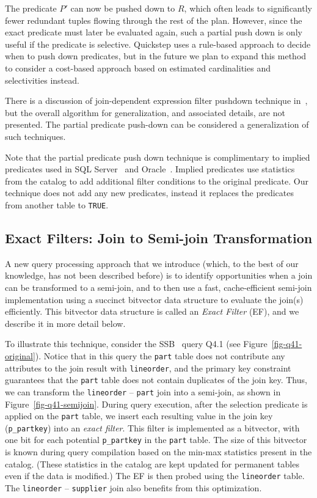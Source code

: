 The predicate $P'$ can now be pushed down to $R$, which often leads to significantly fewer redundant tuples flowing through the rest of the plan. However, since the exact predicate must later be evaluated again, such a partial push down is only useful if the predicate is selective. Quickstep uses a rule-based approach to decide when to push down predicates, but in the future we plan to expand this method to consider a cost-based approach based on estimated cardinalities and selectivities instead.

There is a discussion of join-dependent expression filter pushdown technique in~\cite{BonczNE13}, but the overall algorithm for generalization, and associated details, are not presented. 
The partial predicate push-down can be considered a generalization of such techniques.

Note that the partial predicate push down technique is complimentary to implied predicates used in SQL Server~\cite{sql-server-implied-predicate} and Oracle~\cite{oracle-implied-predicate}.
Implied predicates use statistics from the catalog to add additional filter conditions to the original predicate.
Our technique does not add any new predicates, instead it replaces the predicates from another table to \texttt{TRUE}.

\subsection{Exact Filters: Join to Semi-join Transformation} \label{sec:ef}
A new query processing approach that we introduce (which, to the best of our knowledge, has not been described before) is to identify opportunities when a join can be transformed to a semi-join, and to then use a  fast, cache-efficient semi-join implementation using a succinct bitvector data structure to evaluate the join(s) efficiently. This bitvector data structure is called an \textit{Exact Filter} (EF), and we describe it in more detail below.



To illustrate this technique, consider the SSB~\cite{ssb} query Q4.1 (see Figure~\ref{fig-q41-original}). Notice that in this query the \texttt{part} table does not contribute any attributes to the join result with \texttt{lineorder}, and the primary key constraint guarantees that the \texttt{part} table does not contain duplicates of the join key. Thus, we can transform the \texttt{lineorder} -- \texttt{part} join into a semi-join, as shown in Figure~\ref{fig-q41-semijoin}. During query execution, after the selection predicate is applied on the \texttt{part} table, we insert each resulting value in the join key (\texttt{p\_partkey}) into an \textit{exact filter}. This filter is implemented as a bitvector, with one bit for each potential \texttt{p\_partkey} in the  \texttt{part} table. The size of this bitvector is known during query compilation based on the min-max statistics present in the catalog. (These statistics in the catalog are  kept updated for permanent tables even if the data is modified.) The EF is then probed using the \texttt{lineorder} table. The \texttt{lineorder} -- \texttt{supplier} join also benefits from this optimization.

